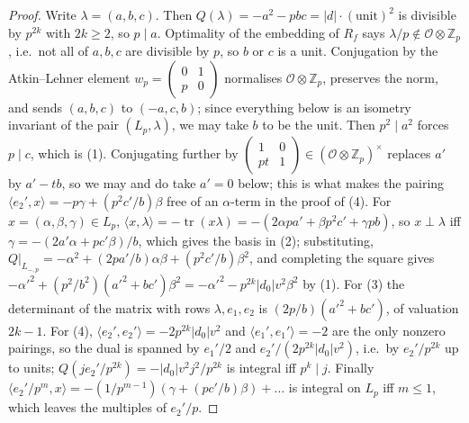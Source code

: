 \documentclass[11pt,reqno]{amsart}
\theoremstyle{plain}
\theoremstyle{definition}
\DeclareMathOperator{\tr}{tr}
\newcommand{\Z}{\mathbb{Z}}
\begin{document}
\begin{proof}
Write $\lambda=(a,b,c)$. Then $Q(\lambda)=-a^2-pbc=\lvert d\rvert\cdot(\text{unit})^2$ is divisible by
$p^{2k}$ with $2k\ge2$, so $p\mid a$. Optimality of the embedding of $R_f$ says $\lambda/p\notin
\mathcal O\otimes\Z_p$, i.e.\ not all of $a,b,c$ are divisible by $p$, so $b$ or $c$ is a unit.
Conjugation by the Atkin--Lehner element $w_p=\begin{pmatrix}0&1\\p&0\end{pmatrix}$ normalises
$\mathcal O\otimes\Z_p$, preserves the norm, and sends $(a,b,c)$ to $(-a,c,b)$; since everything
below is an isometry invariant of the pair $(L_p,\lambda)$, we may take $b$ to be the unit. Then
$p^2\mid a^2$ forces $p\mid c$, which is (1). Conjugating further by $\begin{pmatrix}1&0\\pt&1
\end{pmatrix}\in(\mathcal O\otimes\Z_p)^\times$ replaces $a'$ by $a'-tb$, so we may and do take
$a'=0$ below; this is what makes the pairing $\langle e_2',x\rangle=-p\gamma+(p^2c'/b)\beta$ free of an
$\alpha$-term in the proof of (4). For $x=(\alpha,\beta,\gamma)\in L_p$,
$\langle x,\lambda\rangle=-\tr(x\lambda)=-(2\alpha pa'+\beta p^2c'+\gamma pb)$, so $x\perp\lambda$
iff $\gamma=-(2a'\alpha+pc'\beta)/b$, which gives the basis in (2); substituting,
$Q|_{L_{-,p}}=-\alpha^2+(2pa'/b)\alpha\beta+(p^2c'/b)\beta^2$, and completing the square gives
$-\alpha'^2+(p^2/b^2)(a'^2+bc')\beta^2=-\alpha'^2-p^{2k}\lvert d_0\rvert v^2\beta^2$ by (1). For
(3) the determinant of the matrix with rows $\lambda,e_1,e_2$ is $(2p/b)(a'^2+bc')$, of valuation
$2k-1$. For (4), $\langle e_2',e_2'\rangle=-2p^{2k}\lvert d_0\rvert v^2$ and $\langle e_1',e_1'\rangle
=-2$ are the only nonzero pairings, so the dual is spanned by $e_1'/2$ and $e_2'/(2p^{2k}\lvert d_0
\rvert v^2)$, i.e.\ by $e_2'/p^{2k}$ up to units; $Q(je_2'/p^{2k})=-\lvert d_0\rvert v^2j^2/p^{2k}$ is
integral iff $p^k\mid j$. Finally $\langle e_2'/p^m,x\rangle=-(1/p^{m-1})(\gamma+(pc'/b)\beta)+
\dots$ is integral on $L_p$ iff $m\le1$, which leaves the multiples of $e_2'/p$.
\end{proof}
\end{document}
